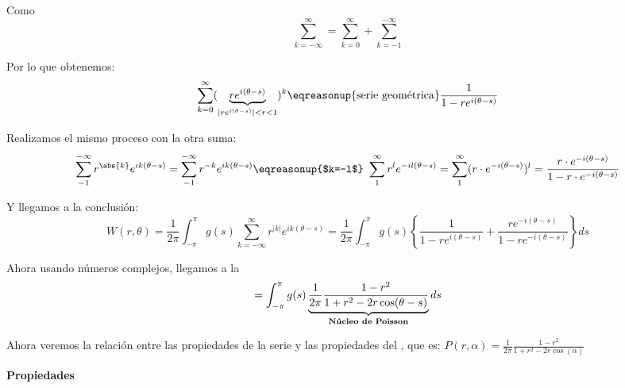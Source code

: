 		Como $$\sum\limits_{k=-\infty}^{\infty} = \sum\limits_{k=0}^{\infty} + \sum\limits_{k=-1}^{-\infty}$$

		Por lo que obtenemos:
		\[
		\sum_{k=0}^{\infty} (\underbrace{r e^{i (\theta-s)}}_{|re^{i(\theta-s)}| < r < 1})^k \eqreasonup{\text{serie geométrica}} \frac{1}{1-re^{i(\theta-s)}}
		\]

		Realizamos el mismo proceso con la otra suma:
		\begin{gather*}
			\sum\limits_{-1}^{-\infty} r^{\abs{k}} e^{ik(\theta-s)} = \sum\limits_{-1}^{-\infty} r^{-k} e^{ik(\theta-s)} \eqreasonup{$k=-l$} \ \sum\limits_{1}^{\infty} r^{l} e^{-il(\theta-s)} = \sum\limits_{1}^{\infty} (r \cdot e^{-i(\theta-s)})^l = \frac{r \cdot e^{-i(\theta-s)}}{1-r \cdot e^{-i(\theta-s)}}
		\end{gather*}

		Y llegamos a la conclusión:
		\[
		W(r,\theta) = \frac{1}{2\pi} \int_{-\pi}^\pi g(s) \sum_{k=-\infty}^\infty r^{|k|} e^{ik(\theta-s)} = \frac{1}{2\pi} \int_{-\pi}^\pi g(s) \left\{ \frac{1}{1-re^{i(\theta-s)}} + \frac{re^{-i(\theta-s)}}{1-re^{-i(\theta-s)}} \right\} ds	\]

		Ahora usando números complejos, llegamos a la 
		\[ = \int^{\pi}_{-\pi} g(s) \underbrace{\frac{1}{2\pi} \frac{1-r^2}{1+r^2-2r\cos (\theta - s)}}_{\text{\bf Núcleo de Poisson}} ds \]

		Ahora veremos la relación entre las propiedades de la serie y las propiedades del , que es:
		\( P(r,\alpha) = \frac{1}{2\pi} \frac{1-r^2}{1+r^2-2r\cos (\alpha)} \label{eq:NucleoPoisson} \)



		\textbf{Propiedades}

